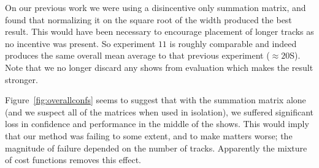 \documentclass[twocolumn]{article}
\begin{document}
On our previous work we were using a disincentive only summation matrix, and found that normalizing it on the square root of the width produced the best result. This would have been necessary to encourage placement of longer tracks as no incentive was present. So experiment $11$ is roughly comparable and indeed produces the same overall mean average to that previous experiment ($\approx 20$S). Note that we no longer discard any shows from evaluation which makes the result stronger. 

Figure~\ref{fig:overallconfs} seems to suggest that with the summation matrix alone (and we suspect all of the matrices when used in isolation), we suffered significant loss in confidence and performance in the middle of the shows. This would imply that our method was failing to some extent, and to make matters worse; the magnitude of failure depended on the number of tracks. Apparently the mixture of cost functions removes this effect.
\end{document}
